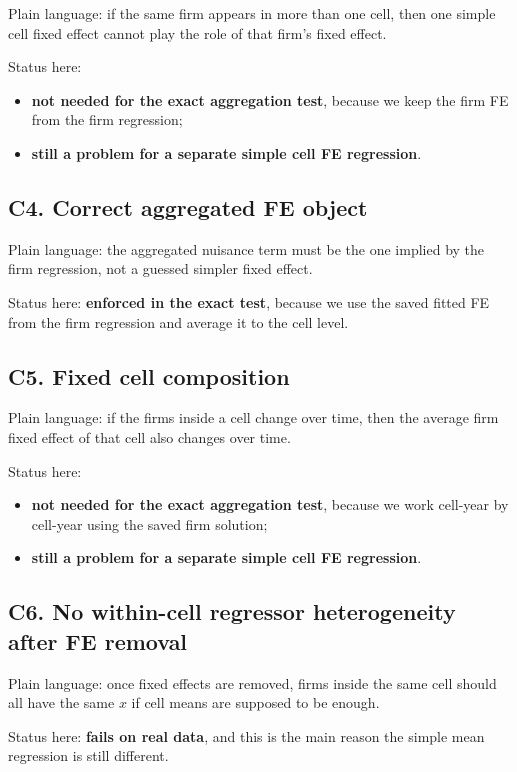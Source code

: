\documentclass[11pt]{article}
\begin{document}
Plain language: if the same firm appears in more than one cell, then one simple cell fixed effect cannot play the role of that firm's fixed effect.

Status here:
\begin{itemize}
  \item \textbf{not needed for the exact aggregation test}, because we keep the firm FE from the firm regression;
  \item \textbf{still a problem for a separate simple cell FE regression}.
\end{itemize}

\subsection*{C4. Correct aggregated FE object}

Plain language: the aggregated nuisance term must be the one implied by the firm regression, not a guessed simpler fixed effect.

Status here: \textbf{enforced in the exact test}, because we use the saved fitted FE from the firm regression and average it to the cell level.

\subsection*{C5. Fixed cell composition}

Plain language: if the firms inside a cell change over time, then the average firm fixed effect of that cell also changes over time.

Status here:
\begin{itemize}
  \item \textbf{not needed for the exact aggregation test}, because we work cell-year by cell-year using the saved firm solution;
  \item \textbf{still a problem for a separate simple cell FE regression}.
\end{itemize}

\subsection*{C6. No within-cell regressor heterogeneity after FE removal}

Plain language: once fixed effects are removed, firms inside the same cell should all have the same $x$ if cell means are supposed to be enough.

Status here: \textbf{fails on real data}, and this is the main reason the simple mean regression is still different.
\end{document}
